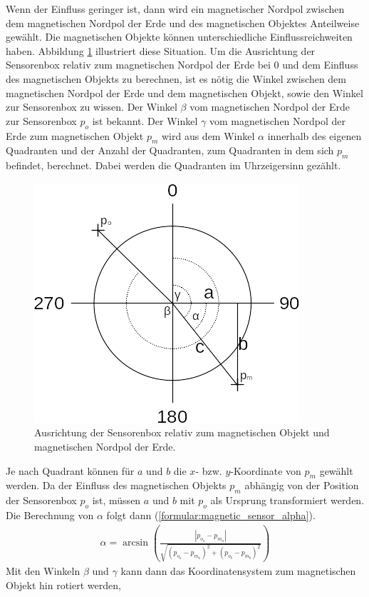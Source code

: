 Wenn der Einfluss geringer ist, dann wird ein magnetischer Nordpol zwischen dem magnetischen Nordpol der Erde und des magnetischen Objektes Anteilweise gewählt.
Die magnetischen Objekte können unterschiedliche Einflussreichweiten haben.
\newline
\newline
Abbildung \ref{fig:magnetic_model} illustriert diese Situation.
Um die Ausrichtung der Sensorenbox relativ zum magnetischen Nordpol der Erde bei 0 und dem Einfluss des magnetischen Objekts zu berechnen,
ist es nötig die Winkel zwischen dem magnetischen Nordpol der Erde und dem magnetischen Objekt, sowie den Winkel zur Sensorenbox zu wissen.
Der Winkel $\beta$ vom magnetischen Nordpol der Erde zur Sensorenbox $p_{o}$ ist bekannt.
Der Winkel $\gamma$ vom magnetischen Nordpol der Erde zum magnetischen Objekt $p_{m}$ wird aus dem Winkel $\alpha$ innerhalb des eigenen Quadranten
und der Anzahl der Quadranten, zum Quadranten in dem sich $p_{m}$ befindet, berechnet.
Dabei werden die Quadranten im Uhrzeigersinn gezählt.
\begin{figure}[h!]
    \centering
    \includegraphics[width=0.5\linewidth]{images/magnetic_model.png}
    \caption{Ausrichtung der Sensorenbox relativ zum magnetischen Objekt und magnetischen Nordpol der Erde.}
    \label{fig:magnetic_model}
\end{figure}
Je nach Quadrant können für $a$ und $b$ die $x$- bzw. $y$-Koordinate von $p_{m}$ gewählt werden.
Da der Einfluss des magnetischen Objekts $p_{m}$ abhängig von der Position der Sensorenbox $p_{o}$ ist,
müssen $a$ und $b$ mit $p_{o}$ als Ursprung transformiert werden.
Die Berechnung von $\alpha$ folgt dann (\ref{formular:magnetic_sensor_alpha}).
\begin{align}
    \label{formular:magnetic_sensor_alpha}
    \alpha = \arcsin (\frac{|p_{o_a} - p_{m_a}|}{\sqrt{(p_{o_a} - p_{m_a})^2 + (p_{o_b} - p_{m_b})^2}})
\end{align}
Mit den Winkeln $\beta$ und $\gamma$ kann dann das Koordinatensystem zum magnetischen Objekt hin rotiert werden,
